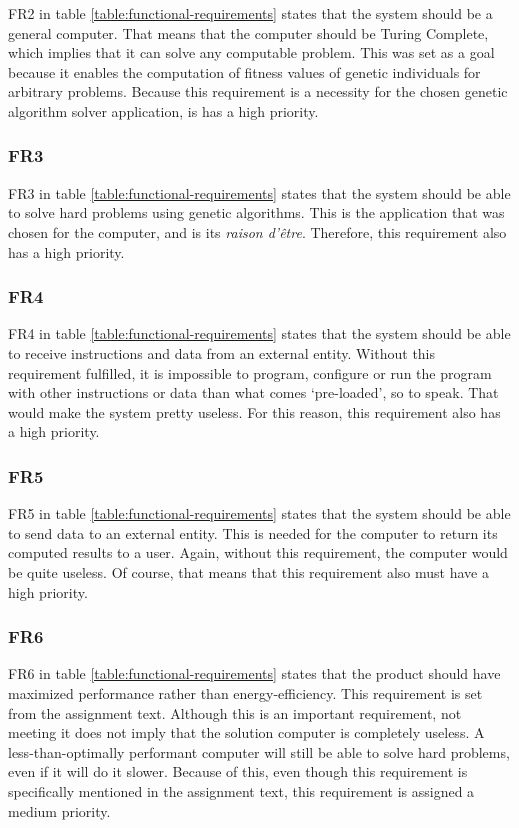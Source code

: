  FR2 in table \vref{table:functional-requirements} states that the system should be a general computer.
 That means that the computer should be Turing Complete, which implies that it can solve any computable problem.
 This was set as a goal because it enables the computation of fitness values of genetic individuals for arbitrary problems. 
 Because this requirement is a necessity for the chosen genetic algorithm solver application, is has a high priority.

\subsubsection{FR3}

FR3 in table \vref{table:functional-requirements} states that the system should be able to solve hard problems using genetic algorithms.
This is the application that was chosen for the computer, and is its \textit{raison d'être}.
Therefore, this requirement also has a high priority.

\subsubsection{FR4}

FR4 in table \vref{table:functional-requirements} states that the system should be able to receive instructions and data from an external entity.
Without this requirement fulfilled, it is impossible to program, configure or run the program with other instructions or data than what comes `pre-loaded', so to speak.
That would make the system pretty useless.
For this reason, this requirement also has a high priority.

\subsubsection{FR5}

FR5 in table \vref{table:functional-requirements} states that the system should be able to send data to an external entity.
This is needed for the computer to return its computed results to a user.
Again, without this requirement, the computer would be quite useless.
Of course, that means that this requirement also must have a high priority.

\subsubsection{FR6}

FR6 in table \vref{table:functional-requirements} states that the product should have maximized performance rather than energy-efficiency.
This requirement is set from the assignment text.
Although this is an important requirement, not meeting it does not imply that the solution computer is completely useless.
A less-than-optimally performant computer will still be able to solve hard problems, even if it will do it slower.
Because of this, even though this requirement is specifically mentioned in the assignment text, this requirement is assigned a medium priority.

